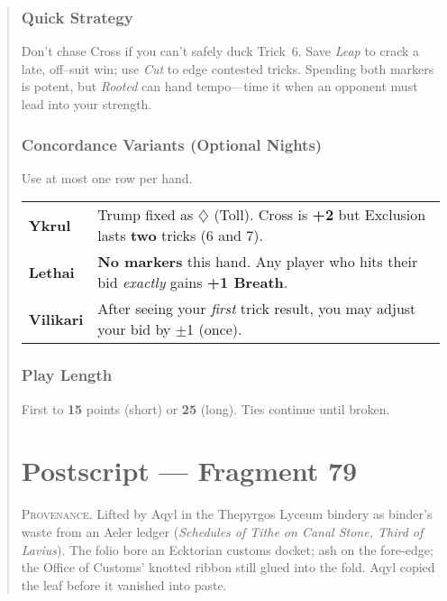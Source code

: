 \documentclass[11pt]{article}
\begin{document}
\begin{quote}
\subsubsection*{Quick Strategy}
Don’t chase Cross if you can’t safely duck Trick~6. Save \emph{Leap} to crack a late,
off–suit win; use \emph{Cut} to edge contested tricks. Spending both markers is potent,
but \emph{Rooted} can hand tempo—time it when an opponent must lead into your strength.

\subsubsection*{Concordance Variants (Optional Nights)}
Use at most one row per hand.
\medskip

\noindent\begin{tabularx}{\linewidth}{@{}>{\bfseries}l X@{}}
\toprule
Ykrul & Trump fixed as $\diamondsuit$ (Toll). Cross is \textbf{+2} but Exclusion lasts \textbf{two} tricks (6 and 7).\\
Lethai & \textbf{No markers} this hand. Any player who hits their bid \emph{exactly} gains \textbf{+1 Breath}.\\
Vilikari & After seeing your \emph{first} trick result, you may adjust your bid by $\pm$1 (once).\\
\bottomrule
\end{tabularx}

\subsubsection*{Play Length}
First to \textbf{15} points (short) or \textbf{25} (long). Ties continue until broken.


\clearpage

\section*{Postscript — Fragment 79}
\label{sec:postscript}

\medskip
\noindent\small\textsc{Provenance.} Lifted by Aqyl in the Thepyrgos Lyceum bindery as binder’s waste from an Aeler ledger (\emph{Schedules of Tithe on Canal Stone, Third of Lavius}). The folio bore an Ecktorian customs docket; ash on the fore-edge; the Office of Customs’ knotted ribbon still glued into the fold. Aqyl copied the leaf before it vanished into paste.\normalsize


\end{quote}
\end{document}
